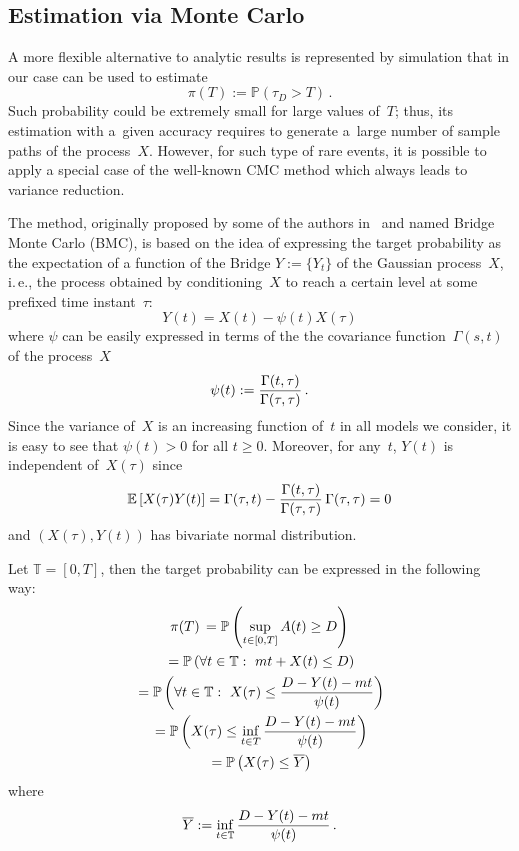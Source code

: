 \begin{multicols}{2}
\section{Estimation via Monte Carlo}

\noindent
A more flexible alternative to analytic results is represented  by simulation 
that in our case can be used to estimate 
\begin{equation*}
\pi(T):=\mathbb{P} \left(\tau_D > T\right)\,.
\end{equation*}
Such probability could be extremely small for large values of~$T$; 
thus, its estimation with a~given accuracy requires to generate a~large number of 
sample paths of the process~$X$. However, for such type of rare events, it is 
possible to apply a special case of the well-known CMC 
method which always leads to variance reduction.

The method, originally proposed by some of the authors 
in~\cite{20-luk-1, 21-luk-1, 22-luk-1} and named Bridge Monte Carlo (BMC), 
is based on the idea of expressing the target probability as the
expectation of a function of the {Bridge} $Y:=\{Y_t\}$ of the
Gaussian process~$X$, i.\,e.,  the process obtained by
conditioning~$X$ to reach a certain level at some prefixed time instant~$\tau$:
\begin{equation*}
Y(t) = X(t) - \psi(t) X(\tau)
\end{equation*}
where $\psi$ can be easily  expressed in terms of the the covariance 
function~$\Gamma(s,t)$ of the process~$X$ 
$$
\psi(t)   :=
\displaystyle\frac{\displaystyle \Gamma(t,\tau)\mathstrut}{\displaystyle \Gamma(\tau, \tau)\mathstrut} \,.  
$$
Since the variance of~$X$ is an increasing function of~$t$ in all models we consider,
it is easy to see that  $\psi(t)>0$ for all $t \ge 0$.
Moreover, for any~$t$, $Y(t)$ is
independent of~$X(\tau)$ since
$$
\mathbb{E} \left[X(\tau)Y(t)\right]=
\Gamma(\tau,t)-
\displaystyle\frac{\displaystyle \Gamma(t,\tau)\mathstrut}{\displaystyle \Gamma(\tau,\tau)\mathstrut}\,\Gamma(\tau, \tau)=0
$$
and $(X(\tau),Y(t))$ has bivariate normal distribution.





Let $\mathbb{T} = [0,T]$, then the target probability can 
be expressed in the following way:
\begin{multline*}
\pi(T)\, =\mathbb{P}\left(\sup\limits_{t \in [0,T]}A(t)\ge D\right)\\
{}=\mathbb{P}\left(\forall t \in \mathbb{T}:\,\,mt+X(t) \le D\right)\\
{}=\mathbb{P}\left( \forall t \in \mathbb{T}:\,\, X(\tau) \le \displaystyle\frac{\displaystyle D-Y(t)-mt\mathstrut}{\displaystyle \psi(t)\mathstrut}\right)\\
{}=\mathbb{P}\left( X(\tau)\le \inf_{t \in T} \displaystyle\frac{\displaystyle D-Y(t)-mt\mathstrut}{\displaystyle \psi(t)\mathstrut}\right)\\
{}=\mathbb{P}\left( X(\tau)\le\overline{Y} \right)
\end{multline*}
where
\begin{equation*}
\overline{Y}:=\inf\limits_{t \in \mathbb{T}}\displaystyle\frac{\displaystyle D-Y(t)-mt\mathstrut}{\displaystyle \psi(t)\mathstrut}\,. 
\end{equation*}


\end{multicols}
